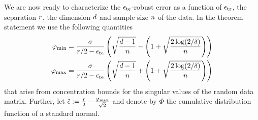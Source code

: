 We are now ready to characterize the
$\epsilon_{\text{te}}$-robust error as a function of $\epsilon_{\text{tr}}$, the separation
$r$, the dimension $d$ and sample size $n$ of the
data. In the theorem statement we use the following quantities
\begin{align*}
      \varphi_{\text{min}} &= \frac{\sigma}{r/2-\epsilon_{\text{te}}}  \left(  \sqrt{\frac{d-1}{n}} - \left(1 + \sqrt{\frac{2 \log (2/\delta)}{n}}\right)\right)\\
      \varphi_{\text{max}} &= \frac{\sigma}{r/2-\epsilon_{\text{te}}}  \left(  \sqrt{\frac{d-1}{n}} + \left(1 + \sqrt{\frac{2 \log (2/\delta)}{n}}\right)\right)
\end{align*}
that arise from concentration bounds for the singular values of the random data matrix. Further, let $\tilde{\epsilon} := \frac{r}{2} - \frac{\varphi_{\text{max}}}{\sqrt{2}}$ and denote by
 $\Phi$ the cumulative distribution function of a standard normal.
